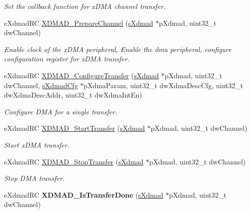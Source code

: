 \begin{DoxyCompactItemize}
\begin{DoxyCompactList}\small\item\em Set the callback function for x\+D\+MA channel transfer. \end{DoxyCompactList}\item 
e\+Xdmad\+RC \mbox{\hyperlink{group__dmad__functions_ga2a7947467c04eb39abee2471d846ee35}{X\+D\+M\+A\+D\+\_\+\+Prepare\+Channel}} (\mbox{\hyperlink{group__dmad__structs_gaf2c13151514615a6beb35c0d868a5053}{s\+Xdmad}} $\ast$p\+Xdmad, uint32\+\_\+t dw\+Channel)
\begin{DoxyCompactList}\small\item\em Enable clock of the x\+D\+MA peripheral, Enable the dma peripheral, configure configuration register for x\+D\+MA transfer. \end{DoxyCompactList}\item 
e\+Xdmad\+RC \mbox{\hyperlink{group__dmad__functions_ga075cce3b88af1fff5064218720811fc0}{X\+D\+M\+A\+D\+\_\+\+Configure\+Transfer}} (\mbox{\hyperlink{group__dmad__structs_gaf2c13151514615a6beb35c0d868a5053}{s\+Xdmad}} $\ast$p\+Xdmad, uint32\+\_\+t dw\+Channel, \mbox{\hyperlink{struct__XdmadCfg}{s\+Xdmad\+Cfg}} $\ast$p\+Xdma\+Param, uint32\+\_\+t dw\+Xdma\+Desc\+Cfg, uint32\+\_\+t dw\+Xdma\+Desc\+Addr, uint32\+\_\+t dw\+Xdma\+Int\+En)
\begin{DoxyCompactList}\small\item\em Configure D\+MA for a single transfer. \end{DoxyCompactList}\item 
e\+Xdmad\+RC \mbox{\hyperlink{group__dmad__functions_ga20bc2d5f85c7145a43d7ccd13b067e50}{X\+D\+M\+A\+D\+\_\+\+Start\+Transfer}} (\mbox{\hyperlink{group__dmad__structs_gaf2c13151514615a6beb35c0d868a5053}{s\+Xdmad}} $\ast$p\+Xdmad, uint32\+\_\+t dw\+Channel)
\begin{DoxyCompactList}\small\item\em Start x\+D\+MA transfer. \end{DoxyCompactList}\item 
e\+Xdmad\+RC \mbox{\hyperlink{group__dmad__functions_ga6be5cec75618250adb227d7588ae7078}{X\+D\+M\+A\+D\+\_\+\+Stop\+Transfer}} (\mbox{\hyperlink{group__dmad__structs_gaf2c13151514615a6beb35c0d868a5053}{s\+Xdmad}} $\ast$p\+Xdmad, uint32\+\_\+t dw\+Channel)
\begin{DoxyCompactList}\small\item\em Stop D\+MA transfer. \end{DoxyCompactList}\item 
\mbox{\label{group__dmad__functions_ga85abf366b35d0d2903f8bbc69b4da242}} 
e\+Xdmad\+RC {\bfseries X\+D\+M\+A\+D\+\_\+\+Is\+Transfer\+Done} (\mbox{\hyperlink{group__dmad__structs_gaf2c13151514615a6beb35c0d868a5053}{s\+Xdmad}} $\ast$p\+Xdmad, uint32\+\_\+t dw\+Channel)
\end{DoxyCompactItemize}
